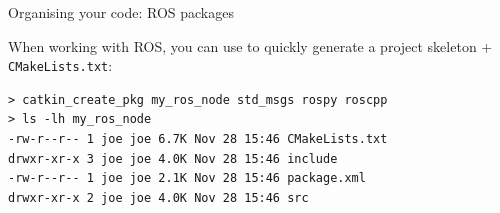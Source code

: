 \documentclass[compress]{beamer}
\begin{document}
\begin{frame}[fragile]{Organising your code: ROS packages}

    When working with ROS, you can use  to quickly
    generate a project skeleton + \texttt{CMakeLists.txt}:

\begin{verbatim}
> catkin_create_pkg my_ros_node std_msgs rospy roscpp
> ls -lh my_ros_node
-rw-r--r-- 1 joe joe 6.7K Nov 28 15:46 CMakeLists.txt
drwxr-xr-x 3 joe joe 4.0K Nov 28 15:46 include
-rw-r--r-- 1 joe joe 2.1K Nov 28 15:46 package.xml
drwxr-xr-x 2 joe joe 4.0K Nov 28 15:46 src
\end{verbatim}


\end{frame}

\end{document}
